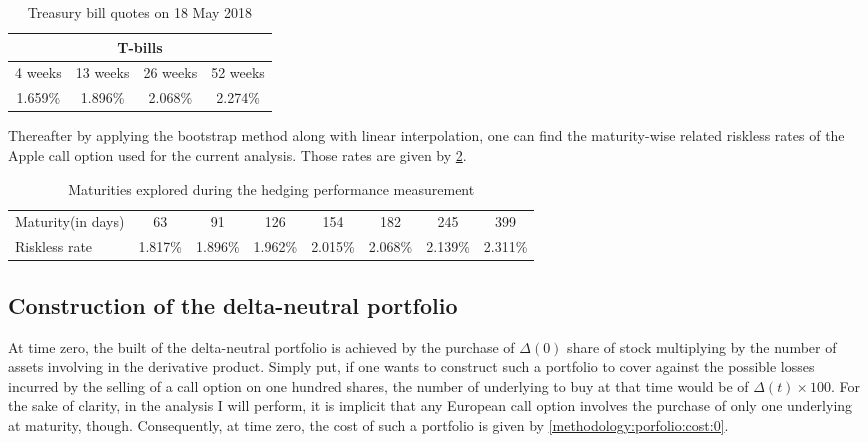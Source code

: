 \documentclass[a4paper, 12pt]{report}
\begin{document}
\begin{table}[h]
\centering
\begin{tabular}{cccc}
  \hline
  \multicolumn{4}{c}{T-bills} \\
  \hline
  4 weeks & 13 weeks & 26 weeks & 52 weeks \\
  1.659\% & 1.896\% & 2.068\% & 2.274\% \\
  \hline
\end{tabular}
\caption{Treasury bill quotes on 18 May 2018} 
\label{tab:methodology:Tbill:compound}
\end{table}

Thereafter by applying the bootstrap method along with linear interpolation, one can find the maturity-wise related riskless rates of the Apple call option used for the current analysis. Those rates are given by \cref{tab:methodology:tbill:maturity}.

\begin{table}[h]
\centering
\begin{tabular}{l|ccccccc}

  \hline
Maturity(in days) & 63   & 91   & 126  & 154    & 182  & 245    & 399 \\ 
Riskless rate     &  1.817\% & 1.896\% & 1.962\% & 2.015\%  & 2.068\%  & 2.139\%   & 2.311\% \\
   \hline
\end{tabular}
\caption{Maturities explored during the hedging performance measurement} 
\label{tab:methodology:tbill:maturity}
\end{table}




\subsection{Construction of the delta-neutral portfolio}
\label{sec:methodology:construction}

At time zero, the built of the delta-neutral portfolio is achieved by the purchase of $\Delta(0)$ share of stock multiplying by the number of assets involving in the derivative product.
Simply put, if one wants to construct such a portfolio to cover against the possible losses incurred by the selling of a call option on one hundred shares, the number of underlying to buy at that time would be of $\Delta(t) \times 100$.
For the sake of clarity, in the analysis I will perform, it is implicit that any European call option involves the purchase of only one underlying at maturity, though.
Consequently, at time zero, the cost of such a portfolio is given by \cref{methodology:porfolio:cost:0}.
\end{document}
